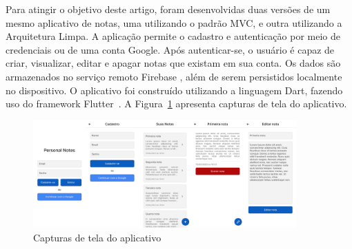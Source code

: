 Para atingir o objetivo deste artigo, foram desenvolvidas duas versões de um mesmo aplicativo de notas, uma utilizando o padrão MVC, e outra utilizando a Arquitetura Limpa.
A aplicação permite o cadastro e autenticação por meio de credenciais ou de uma conta Google.
Após autenticar-se, o usuário é capaz de criar, visualizar, editar e apagar notas que existam em sua conta.
Os dados são armazenados no serviço remoto Firebase \cite{firebase}, além de serem persistidos localmente no dispositivo.
O aplicativo foi construído utilizando a linguagem Dart, fazendo uso do framework Flutter~\cite{flutter}.
A Figura~\ref{fig:screenshots} apresenta capturas de tela do aplicativo.

\begin{figure}[ht]
	\centering
	\includegraphics[width=0.9\textwidth]{images/screenshots.png}
	\caption{Capturas de tela do aplicativo}
	\label{fig:screenshots}
\end{figure}